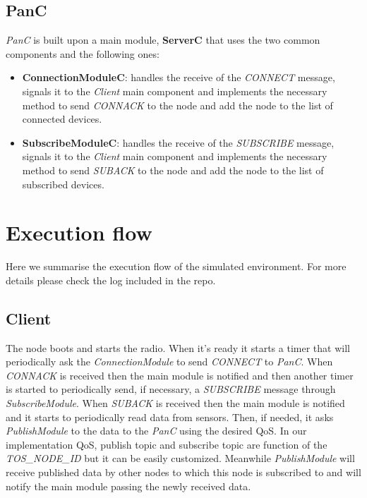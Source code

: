 \documentclass[10pt]{article}
\begin{document}
\subsection{PanC}
\emph{PanC} is built upon a main module, \textbf{ServerC} that uses the two common components and the following ones:
\begin{itemize}
\item \textbf{ConnectionModuleC}: handles the receive of the \emph{CONNECT} message, signals it to the \emph{Client} main component and implements the necessary method to send \emph{CONNACK} to the node and add the node to the list of connected devices. 
\item \textbf{SubscribeModuleC}: handles the receive of the \emph{SUBSCRIBE} message, signals it to the \emph{Client} main component and implements the necessary method to send \emph{SUBACK} to the node and add the node to the list of subscribed devices. 
\end{itemize}

\section{Execution flow}
Here we summarise the execution flow of the simulated environment. For more details please check the log included in the repo.
\subsection{Client}
The node boots and starts the radio. When it's ready it starts a timer that will periodically ask the \emph{ConnectionModule} to send \emph{CONNECT} to \emph{PanC}. When \emph{CONNACK} is received then the main module is notified and then another timer is started to periodically send, if necessary, a \emph{SUBSCRIBE} message through \emph{SubscribeModule}. When \emph{SUBACK} is received then the main module is notified and it starts to periodically read data from sensors. Then, if needed, it asks \emph{PublishModule} to the data to the \emph{PanC} using the desired QoS. In our implementation QoS, publish topic and subscribe topic are function of the \emph{TOS\_NODE\_ID} but it can be easily customized. Meanwhile \emph{PublishModule} will receive published data by other nodes to which this node is subscribed to and will notify the main module passing the newly received data.
\end{document}
